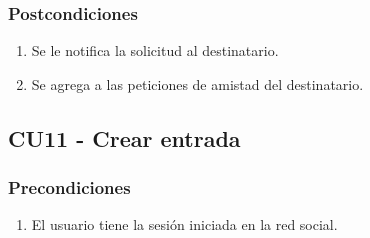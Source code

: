 \documentclass[12pt, a4paper, titlepage]{article}
\begin{document}
\subsubsection{Postcondiciones}
\begin{enumerate}
	\item Se le notifica la solicitud al destinatario.
	\item Se agrega a las peticiones de amistad del destinatario.
\end{enumerate}

\subsection{CU11 - Crear entrada}

\subsubsection{Precondiciones}
\begin{enumerate}
	\item El usuario tiene la sesión iniciada en la red social.
\end{enumerate}
\end{document}
